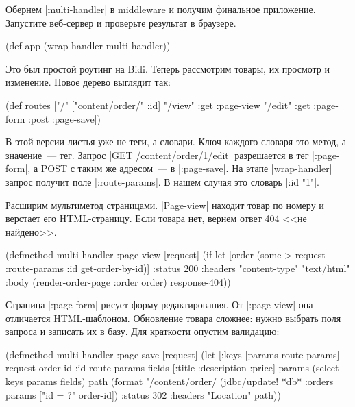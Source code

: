 Обернем \spverb|multi-handler| в middleware и получим финальное
приложение. Запустите веб-сервер и проверьте результат в браузере.

\begin{english}
  \begin{clojure}
(def app (wrap-handler multi-handler))
  \end{clojure}
\end{english}

Это был простой роутинг на Bidi. Теперь рассмотрим товары, их
просмотр и изменение. Новое дерево выглядит так:

\begin{english}
  \begin{clojure}
(def routes
  ["/" {["content/order/" :id]
        {"/view" {:get  :page-view}
         "/edit" {:get  :page-form
                  :post :page-save}}}])
  \end{clojure}
\end{english}

В этой версии листья уже не теги, а словари. Ключ каждого словаря это метод, а
значение~--- тег. Запрос \spverb|GET /content/order/1/edit| разрешается в тег
\spverb|:page-form|, а POST с таким же адресом~--- в \spverb|:page-save|.  На
этапе \spverb|wrap-handler| запрос получит поле \spverb|:route-params|.  В нашем
случая это словарь \spverb|{:id "1"}|.

Расширим мультиметод страницами. \spverb|Page-view| находит товар по номеру и
верстает его HTML-страницу. Если товара нет, вернем ответ 404 <<не найдено>>.

\begin{english}
  \begin{clojure}
(defmethod multi-handler :page-view
  [request]
  (if-let [order (some-> request :route-params
                         :id get-order-by-id)]
    {:status 200
     :headers {"content-type" "text/html"}
     :body (render-order-page {:order order})}
    response-404))
  \end{clojure}
\end{english}

Страница \spverb|:page-form| рисует форму редактирования. От \spverb|:page-view|
она отличается HTML-шаблоном. Обновление товара сложнее: нужно выбрать поля
запроса и записать их в базу. Для краткости опустим валидацию:

\begin{english}
  \begin{clojure}
(defmethod multi-handler :page-save
  [request]
  (let [{:keys [params route-params]} request
        {order-id :id} route-params
        fields [:title :description :price]
        params (select-keys params fields)
        path (format "/content/order/%
    (jdbc/update! *db* :orders params ["id = ?" order-id])
    {:status 302
     :headers {"Location" path}}))
  \end{clojure}
\end{english}

